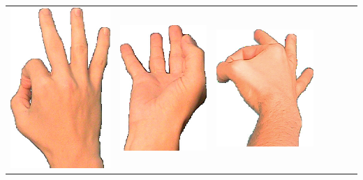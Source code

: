 \documentclass{article}
\begin{document}
\begin{center}
\begin{tabular}{r*{6}{c}}
\includegraphics[scale=0.1]{images/09-01-3.jpg}&
\includegraphics[scale=0.1]{images/09-01-4.jpg}&
\includegraphics[scale=0.1]{images/09-01-5.jpg}&

\end{tabular}
\end{center}
\end{document}

